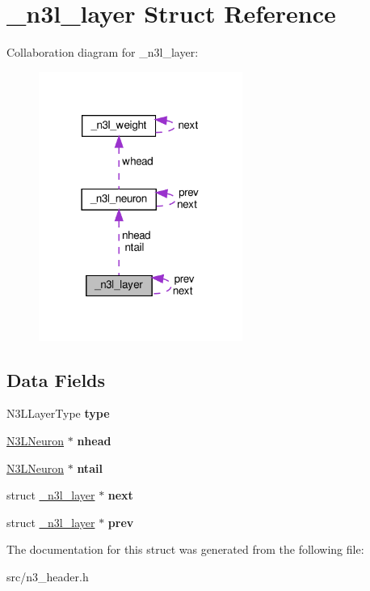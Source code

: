 \hypertarget{struct__n3l__layer}{}\section{\+\_\+n3l\+\_\+layer Struct Reference}
\label{struct__n3l__layer}


Collaboration diagram for \+\_\+n3l\+\_\+layer\+:\nopagebreak
\begin{figure}[H]
\begin{center}
\leavevmode
\includegraphics[width=189pt]{struct__n3l__layer__coll__graph}
\end{center}
\end{figure}
\subsection*{Data Fields}
\begin{DoxyCompactItemize}
\item 
\mbox{\label{struct__n3l__layer_aec180f7f12ea86bb622c364076dbf1f6}} 
N3\+L\+Layer\+Type {\bfseries type}
\item 
\mbox{\label{struct__n3l__layer_a263e7831428a3b535964412a1d802c4e}} 
\mbox{\hyperlink{struct__n3l__neuron}{N3\+L\+Neuron}} $\ast$ {\bfseries nhead}
\item 
\mbox{\label{struct__n3l__layer_aa120fe4ab0898e733b8d6940b467ebc3}} 
\mbox{\hyperlink{struct__n3l__neuron}{N3\+L\+Neuron}} $\ast$ {\bfseries ntail}
\item 
\mbox{\label{struct__n3l__layer_afada0fe8b2a403d5aeeb71b0ae7f8aae}} 
struct \mbox{\hyperlink{struct__n3l__layer}{\+\_\+n3l\+\_\+layer}} $\ast$ {\bfseries next}
\item 
\mbox{\label{struct__n3l__layer_aedfd507c2c60e3b64234b8cd8570e6c9}} 
struct \mbox{\hyperlink{struct__n3l__layer}{\+\_\+n3l\+\_\+layer}} $\ast$ {\bfseries prev}
\end{DoxyCompactItemize}


The documentation for this struct was generated from the following file\+:\begin{DoxyCompactItemize}
\item 
src/n3\+\_\+header.\+h\end{DoxyCompactItemize}
